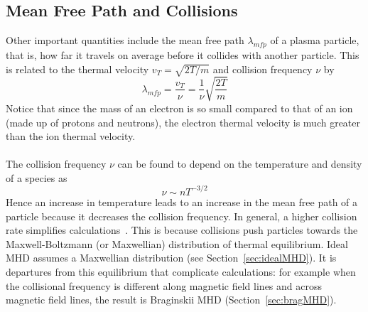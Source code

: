 \subsection{Mean Free Path and Collisions}
Other important quantities include the mean free path $\lambda_{mfp}$ of a plasma particle, that is, how far it travels on average before it collides with another particle. This is related to the thermal velocity $v_T=\sqrt{2T/m}$ and collision frequency $\nu$ by
\begin{equation}
  \lambda_{mfp}=\frac{v_T}{\nu}=\frac1\nu\sqrt{\frac{2T}{m}}
\end{equation}
Notice that since the mass of an electron is so small compared to that of an ion (made up of protons and neutrons), the electron thermal velocity is much greater than the ion thermal velocity.\\
\\
The collision frequency $\nu$ can be found to depend on the temperature and density of a species as
\begin{equation}
  \nu\sim nT^{-3/2}
\end{equation}
Hence an increase in temperature leads to an increase in the mean free path of a particle because it decreases the collision frequency. In general, a higher collision rate simplifies calculations~\cite{Hazeltine2004}. This is because collisions push particles towards the Maxwell-Boltzmann (or Maxwellian) distribution of thermal equilibrium. Ideal MHD assumes a Maxwellian distribution (see Section~\ref{sec:idealMHD}). It is departures from this equilibrium that complicate calculations: for example when the collisional frequency is different along magnetic field lines and across magnetic field lines, the result is Braginskii MHD (Section~\ref{sec:bragMHD}).

